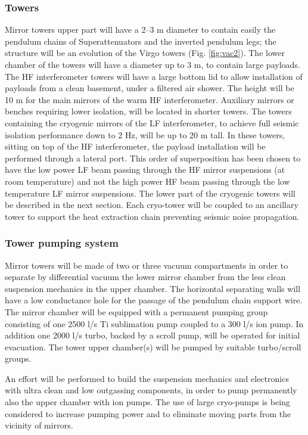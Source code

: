 \subsubsection{Towers}
%
Mirror towers upper part will have a 2--3 m diameter to contain easily the pendulum chains of Superattenuators and the inverted pendulum legs; the structure will be an evolution of the Virgo towers (Fig. \ref{fig:vac2}). The lower chamber of the towers will have a diameter up to 3 m, to contain large payloads. The HF interferometer towers will have a large bottom lid to allow installation of payloads from a clean basement, under a filtered air shower. The height will be 10 m for the main mirrors of the warm HF interferometer. Auxiliary mirrors or benches requiring lower isolation, will be located in shorter towers. The towers containing the cryogenic mirrors of the LF interferometer, to achieve full seismic isolation performance down to 2 Hz, will be up to 20 m tall. In these towers, sitting on top of the HF interferometer, the payload installation will be performed through a lateral port. This order of superposition has been chosen to have the low power LF beam passing through the HF mirror suspensions (at room temperature) and not the high power HF beam passing through the low temperature LF mirror suspensions. The lower part of the cryogenic towers will be described in the next section. Each cryo-tower will be coupled to an ancillary tower to support the heat extraction chain preventing seismic noise propagation.

\subsubsection{Tower pumping system}

Mirror towers will be made of two or three vacuum compartments in order to separate by differential vacuum the lower mirror chamber from the less clean suspension mechanics in the upper chamber. The horizontal separating walls will have a low conductance hole for the passage of the pendulum chain support wire. The mirror chamber will be equipped with a permanent pumping group consisting of one 2500 l/s Ti sublimation pump coupled to a 300 l/s ion pump. In addition one 2000 l/s turbo, backed by a scroll pump, will be operated for initial evacuation. The tower upper chamber(s) will be pumped by suitable turbo/scroll groups.

An effort will be performed to build the suspension mechanics and electronics with ultra clean and low outgassing components, in order to pump permanently also the upper chamber with ion pumps. The use of large cryo-pumps is being considered to increase pumping power and to eliminate moving parts from the vicinity of mirrors.


